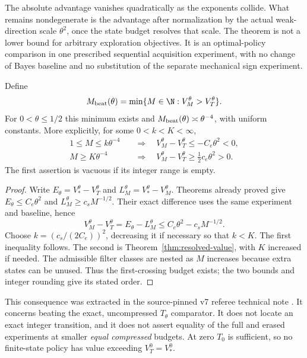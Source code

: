 The absolute advantage vanishes quadratically as the exponents collide.
What remains nondegenerate is the advantage after normalization by the
actual weak-direction scale $\theta^2$, once the state budget resolves
that scale. The theorem is not a lower bound for arbitrary exploration
objectives. It is an optimal-policy comparison in one prescribed
sequential acquisition experiment, with no change of Bayes baseline and
no substitution of the separate mechanical sign experiment.


\begin{corollary}\label{cor:necessary-budget}
Define
\[
 M_{\rm beat}(\theta)=\min\{M\in\N:V_M^\theta>V_T^\theta\}.
\]
For $0<\theta\le1/2$ this minimum exists and
$M_{\rm beat}(\theta)\asymp\theta^{-4}$, with uniform constants.
More explicitly, for some $0<k<K<\infty$,
\[
 \begin{aligned}
 1\le M\le k\theta^{-4}&\quad\Longrightarrow\quad
 V_M^\theta-V_T^\theta\le-C_e\theta^2<0,\\
 M\ge K\theta^{-4}&\quad\Longrightarrow\quad
 V_M^\theta-V_T^\theta\ge\tfrac12c_e\theta^2>0.
 \end{aligned}
\]
The first assertion is vacuous if its integer range is empty.
\end{corollary}
\begin{proof}
Write $E_\theta=V_*^\theta-V_T^\theta$ and
$L_M^\theta=V_*^\theta-V_M^\theta$. Theorems already proved give
$E_\theta\le C_e\theta^2$ and $L_M^\theta\ge c_sM^{-1/2}$.
Their exact difference uses the same experiment and baseline, hence
\[
 V_M^\theta-V_T^\theta=E_\theta-L_M^\theta
             \le C_e\theta^2-c_sM^{-1/2}.
\]
Choose $k=(c_s/(2C_e))^2$, decreasing it if necessary so that $k<K$.
The first inequality follows. The second is
Theorem~\ref{thm:resolved-value}, with $K$ increased if needed.
The admissible filter classes are nested as $M$ increases because extra
states can be unused. Thus the first-crossing budget exists; the two
bounds and integer rounding give its stated order.
\end{proof}

This consequence was extracted in the source-pinned v7 referee technical
note \cite{A1v7note}. It concerns beating the exact, uncompressed
$T_\theta$ comparator. It does not locate an exact integer transition,
and it does not assert equality of the full and erased experiments at
smaller \emph{equal compressed} budgets. At zero $T_0$ is sufficient,
so no finite-state policy has value exceeding $V_T^0=V_*^0$.
